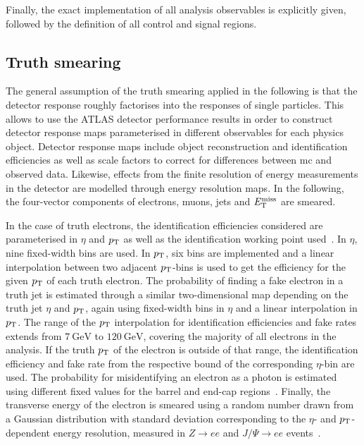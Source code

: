 Finally, the exact implementation of all analysis observables is explicitly given, followed by the definition of all control and signal regions.

\subsection{Truth smearing}\label{sec:truth_smearing}

The general assumption of the truth smearing applied in the following is that the detector response roughly factorises into the responses of single particles.
This allows to use the ATLAS detector performance results in order to construct detector response maps parameterised in different observables for each physics object.
Detector response maps include object reconstruction and identification efficiencies as well as scale factors to correct for differences between \gls{mc} and observed data.
Likewise, effects from the finite resolution of energy measurements in the detector are modelled through energy resolution maps. In the following, the four-vector components of electrons, muons, jets and $E_{\textrm{T}}^{\textrm{miss}}$ are smeared. 

In the case of truth electrons, the identification efficiencies considered are parameterised in $\eta$ and $p_{\textrm{T}}$ as well as the identification working point used~\cite{PERF-2017-01}.
In $\eta$, nine fixed-width bins are used. In $p_{\textrm{T}}$, six bins are implemented and a linear interpolation between two adjacent $p_{\textrm{T}}$-bins is used to get the efficiency for the given $p_{\textrm{T}}$ of each truth electron.
The probability of finding a fake electron in a truth jet is estimated through a similar two-dimensional map depending on the truth jet $\eta$ and $p_{\textrm{T}}$, again using fixed-width bins in $\eta$ and a linear interpolation in $p_{\textrm{T}}$. %
The range of the $p_{\textrm{T}}$ interpolation for identification efficiencies and fake rates extends from $\SI{7}{\GeV}$ to $\SI{120}{\GeV}$, covering the majority of all electrons in the analysis.
If the truth $p_{\textrm{T}}$ of the electron is outside of that range, the identification efficiency and fake rate from the respective bound of the corresponding $\eta$-bin are used.
The probability for misidentifying an electron as a photon is estimated using different fixed values for the barrel and end-cap regions~\cite{PERF-2017-02}.
Finally, the transverse energy of the electron is smeared using a random number drawn from a Gaussian distribution with standard deviation corresponding to the $\eta$- and $p_{\textrm{T}}$-dependent energy resolution, measured in $Z\to ee$ and $J/\Psi\to ee$ events~\cite{PERF-2017-03}.

